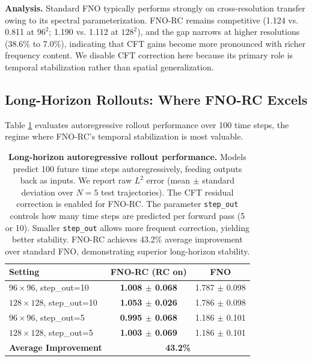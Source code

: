 \documentclass[11pt]{article}
\begin{document}
\textbf{Analysis.} Standard FNO typically performs strongly on cross-resolution transfer owing to its spectral parameterization. FNO-RC remains competitive (1.124 vs. 0.811 at $96^2$; 1.190 vs. 1.112 at $128^2$), and the gap narrows at higher resolutions (38.6\% to 7.0\%), indicating that CFT gains become more pronounced with richer frequency content. We disable CFT correction here because its primary role is temporal stabilization rather than spatial generalization.

\subsection{Long-Horizon Rollouts: Where FNO-RC Excels}

Table \ref{tab:rollout} evaluates autoregressive rollout performance over 100 time steps, the regime where FNO-RC's temporal stabilization is most valuable.

\begin{table}[h]
\centering
\caption{\textbf{Long-horizon autoregressive rollout performance.} Models predict 100 future time steps autoregressively, feeding outputs back as inputs. We report raw $L^2$ error (mean $\pm$ standard deviation over $N=5$ test trajectories). The CFT residual correction is enabled for FNO-RC. The parameter \texttt{step\_out} controls how many time steps are predicted per forward pass (5 or 10). Smaller \texttt{step\_out} allows more frequent correction, yielding better stability. FNO-RC achieves 43.2\% average improvement over standard FNO, demonstrating superior long-horizon stability.}
\label{tab:rollout}
\small
\begin{tabular}{@{}lcc@{}}
\toprule
\textbf{Setting} & \textbf{FNO-RC (RC on)} & \textbf{FNO} \\
\midrule
$96 \times 96$, step\_out=10 & \textbf{1.008 $\pm$ 0.068} & 1.787 $\pm$ 0.098 \\
$128 \times 128$, step\_out=10 & \textbf{1.053 $\pm$ 0.026} & 1.786 $\pm$ 0.098 \\
$96 \times 96$, step\_out=5 & \textbf{0.995 $\pm$ 0.068} & 1.186 $\pm$ 0.101 \\
$128 \times 128$, step\_out=5 & \textbf{1.003 $\pm$ 0.069} & 1.186 $\pm$ 0.101 \\
\midrule
\textbf{Average Improvement} & \multicolumn{2}{c}{\textbf{43.2\%}} \\
\bottomrule
\end{tabular}
\end{table}
\end{document}
